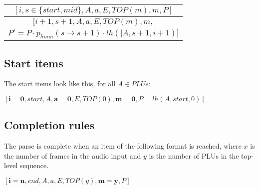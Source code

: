 \documentclass[12pt,letterpaper]{article}
\newcommand{\myrule}[2]{\begin{tabular}{c}
#1 \\
\hline
#2
\end{tabular}}
\newcommand{\toprulecomp}[8]{
    $[#1, #2, #3, #4, #5, #6, #7, #8 ]$
}
\newcommand{\botrulecomp}[8]{
    $[#1, #2, #3, #4, #5, #6, #7,$ \\
    $#8 ]$
}
\begin{document}
\myrule{
	\toprulecomp{i}{s\in\{start,mid\}}{A}{a}{E}{TOP(m)}{m}{P}
	}
	{
	\botrulecomp{i+1}{s+1}{A}{a}{E}{TOP(m)}{m}{P'= P \cdot p_{hmm}(s \rightarrow s+1) \cdot lh(|A,s+1,i+1)}
	}
	
\subsection{Start items}

The start items look like this, for all $A\in {PLUs}$:	

\toprulecomp{\mathbf{i=0}}{start}{A}{\mathbf{a=0}}{E}{TOP(0)}{\mathbf{m=0}}{P=lh(A,start,0)}
	
\subsection{Completion rules}

The parse is complete when an item of the following format is reached, where $x$ is the number of frames in the audio input and $y$ is the number of PLUs in the top-level sequence.

\toprulecomp{\mathbf{i=n}}{end}{A}{a}{E}{TOP(y)}{\mathbf{m=y}}{P}
\end{document}
